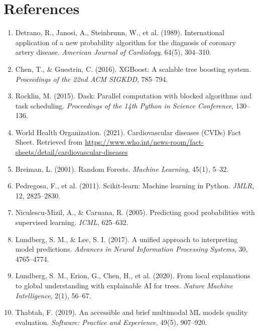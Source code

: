 \documentclass[12pt,a4paper]{article}
\begin{document}
\section*{References}

\begin{enumerate}
    \item Detrano, R., Janosi, A., Steinbrunn, W., et al. (1989). International application of a new probability algorithm for the diagnosis of coronary artery disease. \textit{American Journal of Cardiology}, 64(5), 304--310.

    \item Chen, T., \& Guestrin, C. (2016). XGBoost: A scalable tree boosting system. \textit{Proceedings of the 22nd ACM SIGKDD}, 785--794.

    \item Rocklin, M. (2015). Dask: Parallel computation with blocked algorithms and task scheduling. \textit{Proceedings of the 14th Python in Science Conference}, 130--136.

    \item World Health Organization. (2021). Cardiovascular diseases (CVDs) Fact Sheet. Retrieved from \url{https://www.who.int/news-room/fact-sheets/detail/cardiovascular-diseases}

    \item Breiman, L. (2001). Random Forests. \textit{Machine Learning}, 45(1), 5--32.

    \item Pedregosa, F., et al. (2011). Scikit-learn: Machine learning in Python. \textit{JMLR}, 12, 2825--2830.

    \item Niculescu-Mizil, A., \& Caruana, R. (2005). Predicting good probabilities with supervised learning. \textit{ICML}, 625--632.
    
    \item Lundberg, S. M., \& Lee, S. I. (2017). A unified approach to interpreting model predictions. \textit{Advances in Neural Information Processing Systems}, 30, 4765--4774.
    
    \item Lundberg, S. M., Erion, G., Chen, H., et al. (2020). From local explanations to global understanding with explainable AI for trees. \textit{Nature Machine Intelligence}, 2(1), 56--67.
    
    \item Thabtah, F. (2019). An accessible and brief multimodal ML models quality evaluation. \textit{Software: Practice and Experience}, 49(5), 907--920.
\end{enumerate}
\end{document}
